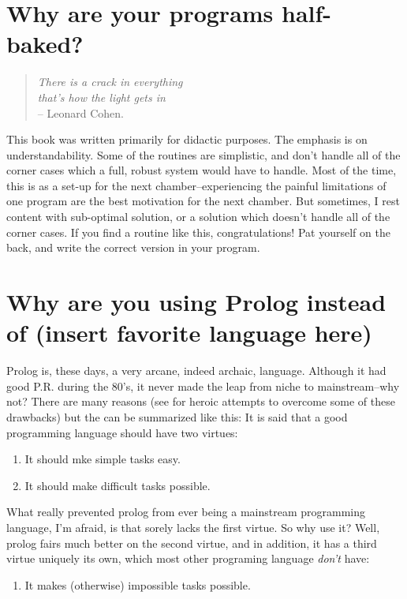 \documentclass{book}[9pt]
\begin{document}
\section{Why are your programs half-baked?}

\begin{quote}
{\em There is a crack in everything \\ that's how the light gets in
  \\ } -- Leonard Cohen.
\end{quote}

This book was written primarily for didactic purposes.  The emphasis
is on understandability.  Some of the routines are simplistic, and
don't handle all of the corner cases which a full, robust system would
have to handle.  Most of the time, this is as a set-up for the next
chamber--experiencing the painful limitations of one program are the
best motivation for the next chamber.  But sometimes, I rest content
with sub-optimal solution, or a solution which doesn't handle all of
the corner cases.  If you find a routine like this, congratulations!
Pat yourself on the back, and write the correct version in your
program.


\section{Why are you using Prolog instead of (insert favorite language here)}

Prolog is, these days, a very arcane, indeed archaic, language.
Although it had good P.R. during the 80's, it never made the leap from
niche to mainstream--why not?  There are many reasons (see
\cite{teaching_prolog_book} for heroic attempts to overcome some of
these drawbacks) but the can be summarized like this: It is said that
a good programming language should have two virtues:
\begin{enumerate}
\item It should mke simple tasks easy.
\item It should make difficult tasks possible.
\end{enumerate}
\noindent What really prevented prolog from ever being a mainstream
programming language, I'm afraid, is that sorely lacks the first virtue.
So why use it?  Well, prolog fairs much better on the second virtue, and
in addition, it has a third virtue uniquely its own, which most other 
programing language {\em don't} have:
\begin{enumerate}
\item It makes (otherwise) impossible tasks possible.
\end{enumerate}
\end{document}
